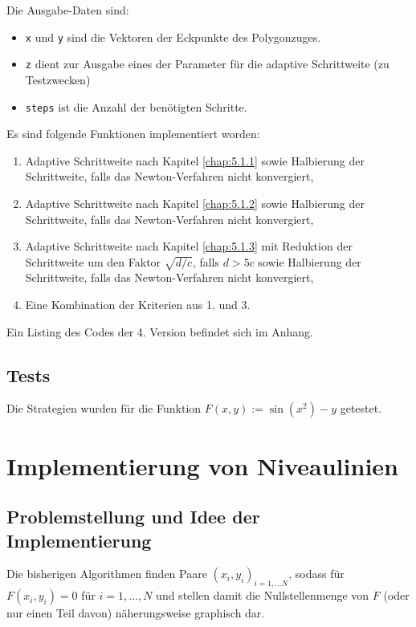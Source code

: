 \documentclass[a4paper,11pt,bibliography=totoc,listof=totoc,headinclude=true,cleardoublepage=empty,oneside]{scrartcl}
\begin{document}
Die Ausgabe-Daten sind:
\begin{itemize}
	\item \verb|x| und \verb|y| sind die Vektoren der Eckpunkte des Polygonzuges.
	\item \verb|z| dient zur Ausgabe eines der Parameter für die adaptive Schrittweite (zu Testzwecken)
	\item \verb|steps| ist die Anzahl der benötigten Schritte.
\end{itemize}

Es sind folgende Funktionen implementiert worden:
\begin{enumerate}
	\item Adaptive Schrittweite nach Kapitel \ref{chap:5.1.1} sowie Halbierung der Schrittweite, falls das Newton-Verfahren nicht konvergiert,
	\item Adaptive Schrittweite nach Kapitel \ref{chap:5.1.2} sowie Halbierung der Schrittweite, falls das Newton-Verfahren nicht konvergiert,
	\item Adaptive Schrittweite nach Kapitel \ref{chap:5.1.3} mit Reduktion der Schrittweite um den Faktor $\sqrt{d/c}$, falls $d>5c$ sowie Halbierung der Schrittweite, falls das Newton-Verfahren nicht konvergiert,
	\item Eine Kombination der Kriterien aus 1. und 3.
\end{enumerate}

Ein Listing des Codes der 4. Version befindet sich im Anhang. 

\subsection{Tests}
Die Strategien wurden für die Funktion $F(x,y) := \sin(x^2)-y$ getestet.

\section{Implementierung von Niveaulinien}
\subsection{Problemstellung und Idee der Implementierung}

Die bisherigen Algorithmen finden Paare $(x_i,y_i)_{i=1,\dots N}$, sodass für $F(x_i,y_i)=0$ für $i=1,\dots, N$ und stellen damit die Nullstellenmenge von $F$ (oder nur einen Teil davon) näherungsweise graphisch dar. 
\end{document}
